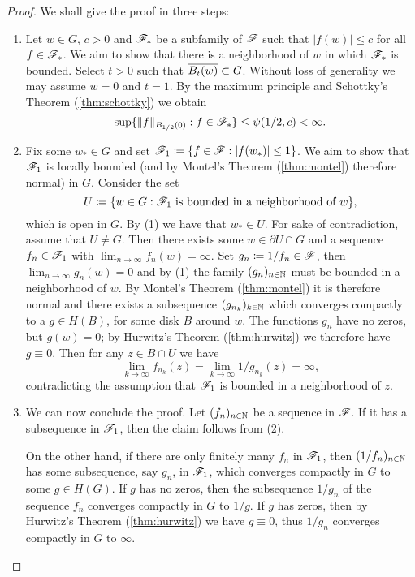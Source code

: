 \begin{proof}
    We shall give the proof in three steps:
    \begin{enumerate}
        \item Let $w \in G$, $c > 0$ and $\mathscr{F}_*$ be a subfamily of $\mathscr{F}$ such that $\vert f(w) \vert \leq c$ for all $f \in \mathscr{F}_*$. We aim to show that there is a neighborhood of $w$ in which $\mathscr{F}_*$ is bounded. Select $t > 0$ such that $\overline{B_t(w)} \subset G$. Without loss of generality we may assume $w = 0$ and $t = 1$. By the maximum principle and Schottky's Theorem (\ref{thm:schottky}) we obtain
        $$ \sup \{ \Vert f \Vert_{B_{1/2}(0)} : f \in \mathscr{F}_* \} \leq \psi(1/2, c) < \infty. $$

        \item Fix some $w_* \in G$ and set $\mathscr{F}_1 \coloneqq \{ f \in \mathscr{F} : \vert f(w_*) \vert \leq 1 \}$. We aim to show that $\mathscr{F}_1$ is locally bounded (and by Montel's Theorem (\ref{thm:montel}) therefore normal) in $G$. Consider the set
        $$ U \coloneqq \{ w \in G : \mathscr{F}_1 \textrm{ is bounded in a neighborhood of } w \}, $$
        which is open in $G$. By (1) we have that $w_* \in U$. For sake of contradiction, assume that $U \neq G$. Then there exists some $w \in \partial U \cap G$ and a sequence $f_n \in \mathscr{F}_1$ with $\lim_{n \to \infty} f_n(w) = \infty$. Set $g_n \coloneqq 1 / f_n \in \mathscr{F}$, then $\lim_{n \to \infty} g_n(w) = 0$ and by (1) the family $(g_n)_{n \in \mathbb{N}}$ must be bounded in a neighborhood of $w$. By Montel's Theorem (\ref{thm:montel}) it is therefore normal and there exists a subsequence $(g_{n_k})_{k \in \mathbb{N}}$ which converges compactly to a $g \in H(B)$, for some disk $B$ around $w$. The functions $g_n$ have no zeros, but $g(w) = 0$; by Hurwitz's Theorem (\ref{thm:hurwitz}) we therefore have $g \equiv 0$. Then for any $z \in B \cap U$ we have
        $$ \lim_{k \to \infty} f_{n_k}(z) = \lim_{k \to \infty} 1 / g_{n_k}(z) = \infty, $$
        contradicting the assumption that $\mathscr{F}_1$ is bounded in a neighborhood of $z$.

        \item We can now conclude the proof. Let $(f_n)_{n \in \mathbb{N}}$ be a sequence in $\mathscr{F}$. If it has a subsequence in $\mathscr{F}_1$, then the claim follows from (2).
        
        On the other hand, if there are only finitely many $f_n$ in $\mathscr{F}_1$, then $(1 / f_n)_{n \in \mathbb{N}}$ has some subsequence, say $g_n$, in $\mathscr{F}_1$, which converges compactly in $G$ to some $g \in H(G)$. If $g$ has no zeros, then the subsequence $1 / g_n$ of the sequence $f_n$ converges compactly in $G$ to $1 / g$. If $g$ has zeros, then by Hurwitz's Theorem (\ref{thm:hurwitz}) we have $g \equiv 0$, thus $1 / g_n$ converges compactly in $G$ to $\infty$.
    \end{enumerate}
\end{proof}

